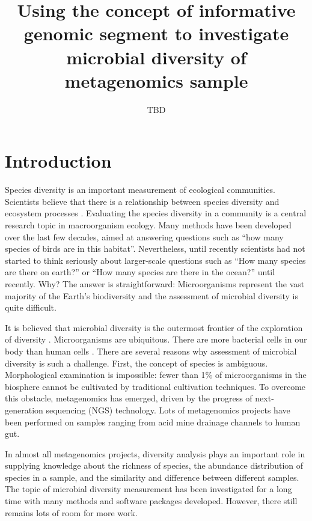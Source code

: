\documentclass{article}
\begin{document}
\title{Using the concept of informative genomic segment to investigate 
microbial diversity of metagenomics sample}
\author{TBD}
\maketitle
\tableofcontents
\begin{abstract}
\end{abstract}

\section{Introduction}


Species diversity is an important measurement of ecological
communities. Scientists believe that there is a relationship between species
diversity and ecosystem processes \cite{Loreau:2001aa}. Evaluating the species
diversity in a community is a central research topic in macroorganism ecology.
Many methods have been developed over the last few decades, aimed at answering
questions such as ``how many species of birds are in this habitat''.
Nevertheless, until recently scientists had not started to think seriously
about larger-scale questions such as ``How many species are there on earth?''
\cite{May:1988aa} or ``How many species are there in the ocean?''
\cite{Mora:2011aa} until recently. Why? The answer is straightforward:
Microorganisms represent the vast majority of the Earth's biodiversity and the
assessment of microbial diversity is quite difficult.

It is believed that microbial diversity is the outermost frontier of the
exploration of diversity \cite{magurran2011biological}. Microorganisms are
ubiquitous. There are more
bacterial cells in our body than human cells \cite{Savage:1977aa}. 
There are several reasons why assessment of microbial diversity is such a
challenge. First, the concept of species is ambiguous. Morphological
examination is impossible: fewer than 1\% of microorganisms in the biosphere
cannot be cultivated by traditional cultivation
techniques\cite{Curtis:2002aa}. To overcome this obstacle, metagenomics has
emerged, driven by the progress of next-generation sequencing (NGS) technology.
Lots of metagenomics projects have been performed on samples ranging from acid
mine drainage channels to human gut. 

In almost all metagenomics projects, diversity analysis plays an important
role in supplying knowledge about the richness of species, the 
abundance distribution of species in a sample, and the similarity and difference between
different samples. The topic of microbial diversity measurement has been
investigated for a long time with many methods and software packages developed.
However, there still remains lots of room for more work.
\end{document}
